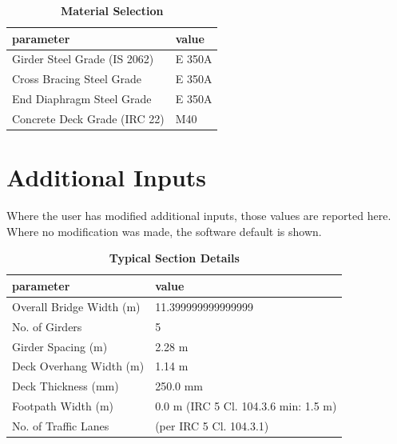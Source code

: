 \documentclass[12pt,a4paper]{report}
\numberwithin{table}{chapter}
\numberwithin{figure}{chapter}
\begin{document}
\begin{table}[H]
\caption{\textbf{Material Selection}}
\label{subsec:material}
\begin{tabular}{|L{5.5cm}|L{8.5cm}|}
\hline
\textbf{parameter} & \textbf{value} \\
\hline
\textnormal{Girder Steel Grade (IS 2062)} & E 350A \\
\hline
\textnormal{Cross Bracing Steel Grade} & E 350A \\
\hline
\textnormal{End Diaphragm Steel Grade} & E 350A \\
\hline
\textnormal{Concrete Deck Grade (IRC 22)} & M40 \\
\hline
\end{tabular}
\end{table}
\vspace{0.4cm}

\newpage
\section{Additional Inputs}
\label{sec:additional-inputs}

Where the user has modified additional inputs, those values are reported here. Where no modification was made, the software default is shown.

\vspace{0.8cm}

\begin{longtable}{|L{5.5cm}|p{10.0cm}|}
\caption{\textbf{Typical Section Details}}
\hline
\textbf{parameter} & \textbf{value} \\
\hline
\textnormal{Overall Bridge Width (m)} & 11.399999999999999 \\[6pt]
\hline
\textnormal{No. of Girders} & 5 \\[6pt]
\hline
\textnormal{Girder Spacing (m)} & 2.28 m \\[6pt]
\hline
\textnormal{Deck Overhang Width (m)} & 1.14 m \\[6pt]
\hline
\textnormal{Deck Thickness (mm)} & 250.0 mm \\[6pt]
\hline
\textnormal{Footpath Width (m)} & 0.0 m (IRC 5 Cl. 104.3.6 min: 1.5 m) \\[6pt]
\hline
\textnormal{No. of Traffic Lanes} &  (per IRC 5 Cl. 104.3.1) \\[6pt]
\hline
\end{longtable}

\vspace{0.8em}
\end{document}
